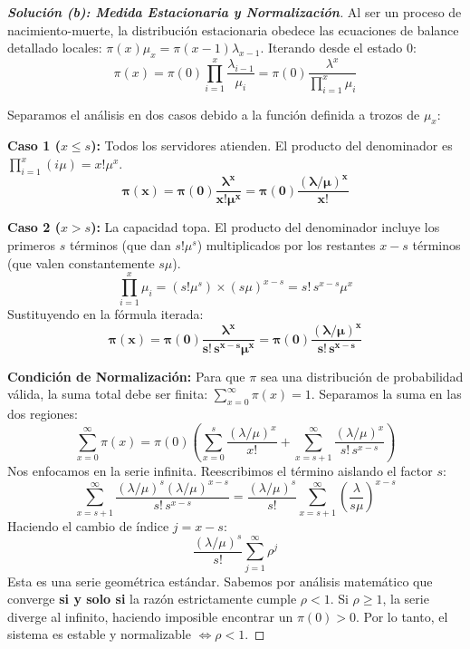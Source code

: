 \documentclass[10pt,a4paper]{article}
\begin{document}
\vspace{5mm}

\begin{proof}[\textbf{Solución (b): Medida Estacionaria y Normalización}]
    Al ser un proceso de nacimiento-muerte, la distribución estacionaria obedece las ecuaciones de balance detallado locales: $\pi(x)\mu_x = \pi(x-1)\lambda_{x-1}$.
    Iterando desde el estado $0$:
    \[ \pi(x) = \pi(0) \prod_{i=1}^x \frac{\lambda_{i-1}}{\mu_i} = \pi(0) \frac{\lambda^x}{\prod_{i=1}^x \mu_i} \]
    
    Separamos el análisis en dos casos debido a la función definida a trozos de $\mu_x$:
    
    \textbf{Caso 1 ($x \le s$):} Todos los servidores atienden. El producto del denominador es $\prod_{i=1}^x (i\mu) = x! \mu^x$.
    \[ \mathbf{\pi(x) = \pi(0) \frac{\lambda^x}{x! \mu^x} = \pi(0) \frac{(\lambda/\mu)^x}{x!}} \]
    
    \textbf{Caso 2 ($x > s$):} La capacidad topa. El producto del denominador incluye los primeros $s$ términos (que dan $s! \mu^s$) multiplicados por los restantes $x-s$ términos (que valen constantemente $s\mu$).
    \[ \prod_{i=1}^x \mu_i = (s! \mu^s) \times (s\mu)^{x-s} = s! \, s^{x-s} \mu^x \]
    Sustituyendo en la fórmula iterada:
    \[ \mathbf{\pi(x) = \pi(0) \frac{\lambda^x}{s! \, s^{x-s} \mu^x} = \pi(0) \frac{(\lambda/\mu)^x}{s! \, s^{x-s}}} \]
    
    \textbf{Condición de Normalización:}
    Para que $\pi$ sea una distribución de probabilidad válida, la suma total debe ser finita: $\sum_{x=0}^\infty \pi(x) = 1$.
    Separamos la suma en las dos regiones:
    \[ \sum_{x=0}^\infty \pi(x) = \pi(0) \left( \sum_{x=0}^s \frac{(\lambda/\mu)^x}{x!} + \sum_{x=s+1}^\infty \frac{(\lambda/\mu)^x}{s! \, s^{x-s}} \right) \]
    Nos enfocamos en la serie infinita. Reescribimos el término aislando el factor $s$:
    \[ \sum_{x=s+1}^\infty \frac{(\lambda/\mu)^s (\lambda/\mu)^{x-s}}{s! \, s^{x-s}} = \frac{(\lambda/\mu)^s}{s!} \sum_{x=s+1}^\infty \left( \frac{\lambda}{s\mu} \right)^{x-s} \]
    Haciendo el cambio de índice $j = x-s$:
    \[ \frac{(\lambda/\mu)^s}{s!} \sum_{j=1}^\infty \rho^j \]
    Esta es una serie geométrica estándar. Sabemos por análisis matemático que converge \textbf{si y solo si} la razón estrictamente cumple $\rho < 1$. Si $\rho \ge 1$, la serie diverge al infinito, haciendo imposible encontrar un $\pi(0) > 0$. Por lo tanto, el sistema es estable y normalizable \textbf{$\iff \rho < 1$}.
\end{proof}
\end{document}
